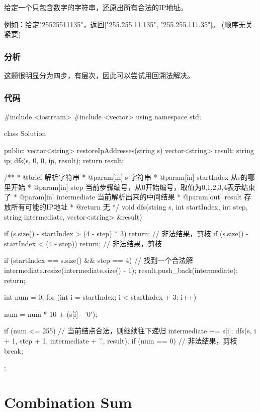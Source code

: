 给定一个只包含数字的字符串，还原出所有合法的IP地址。

例如：给定"25525511135"，返回["255.255.11.135", "255.255.111.35"]。 (顺序无关紧要)

\subsubsection{分析}
这题很明显分为四步，有层次，因此可以尝试用回溯法解决。

\subsubsection{代码}
\begin{Codex}[label=restore_ip_adresses.cpp]
#include <iostream>
#include <vector>
using namespace std;

class Solution {
public:
    vector<string> restoreIpAddresses(string s) {
        vector<string> result;
        string ip;
        dfs(s, 0, 0, ip, result);
        return result;
    }

    /**
     * @brief 解析字符串
     * @param[in] s 字符串
     * @param[in] startIndex 从s的哪里开始
     * @param[in] step 当前步骤编号，从0开始编号，取值为0,1,2,3,4表示结束了
     * @param[in] intermediate 当前解析出来的中间结果
     * @param[out] result 存放所有可能的IP地址
     * @return 无
     */
    void dfs(string s, int startIndex, int step, string intermediate,
            vector<string> &result) {
        if (s.size() - startIndex > (4 - step) * 3)
            return;  // 非法结果，剪枝
        if (s.size() - startIndex < (4 - step))
            return;  // 非法结果，剪枝

        if (startIndex == s.size() && step == 4) {  // 找到一个合法解
            intermediate.resize(intermediate.size() - 1);
            result.push_back(intermediate);
            return;
        }

        int num = 0;
        for (int i = startIndex; i < startIndex + 3; i++) {
            num = num * 10 + (s[i] - '0');

            if (num <= 255) {  // 当前结点合法，则继续往下递归
                intermediate += s[i];
                dfs(s, i + 1, step + 1, intermediate + '.', result);
            }
            if (num == 0) {  // 非法结果，剪枝
                break;
            }
        }
    }
};
\end{Codex}


\section{Combination Sum} %

